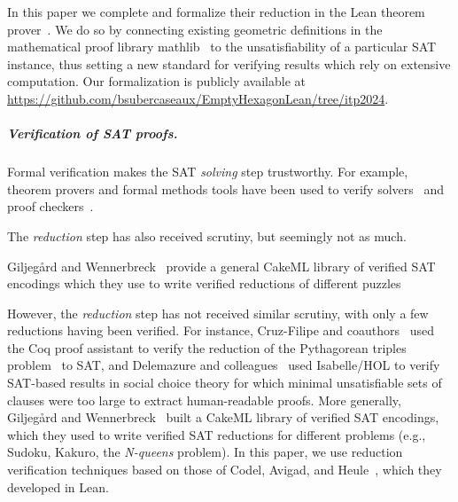 
In this paper we complete and formalize their reduction in the Lean theorem prover~\cite{demouraLeanTheoremProver2015}. We do so by connecting existing geometric definitions
in the mathematical proof library \textsf{mathlib}~\cite{The_mathlib_Community_2020}
to the unsatisfiability of a particular SAT instance, thus setting a new standard for verifying results which rely on extensive computation.
Our formalization is publicly available at \url{https://github.com/bsubercaseaux/EmptyHexagonLean/tree/itp2024}.


\subparagraph*{Verification of SAT proofs.}
Formal verification makes the SAT \emph{solving} step trustworthy.
For example, theorem provers and formal methods tools have been used to verify solvers~\cite{10maric_formal_verification_modern_sat_solver_shallow_embedding_isabelle_hol,oeVersatVerifiedModern2012,skotam_creusat_2022}
and proof checkers~\cite{lammichEfficientVerifiedSAT2020,tanVerifiedPropagationRedundancy2023}.


The \emph{reduction} step has also received scrutiny,
but seemingly not as much.

Giljeg\r{a}rd and Wennerbreck~\cite{GilAndWennerbeck} provide a general \textsf{CakeML} library
of verified SAT encodings
which they use to write verified reductions of different puzzles


However, the \emph{reduction} step has not received similar scrutiny,
with only a few reductions having been verified.
For instance,
Cruz-Filipe and coauthors~\cite{formalPythagoreanTriples,LPAR-21:Formally_Proving_Boolean_Pythagorean}
used the \textsf{Coq} proof assistant
to verify the reduction of the Pythagorean triples problem~\cite{Heule_2016} to SAT,
and Delemazure and colleagues~\cite{23delemazure_strategyproofness_proportionality_party_approval_multiwinner_elections}
used \textsf{Isabelle/HOL} to
verify SAT-based results in social choice theory
for which minimal unsatisfiable sets of clauses
were too large to extract human-readable proofs.
More generally,
Giljeg\r{a}rd and Wennerbreck~\cite{GilAndWennerbeck} built a \textsf{CakeML} library
of verified SAT encodings,
which they used to write verified SAT reductions for different problems
(e.g., Sudoku, Kakuro, the \emph{N-queens} problem).
In this paper,
we use reduction verification techniques based on those of Codel, Avigad, and Heule~\cite{Cayden},
which they developed in Lean.

